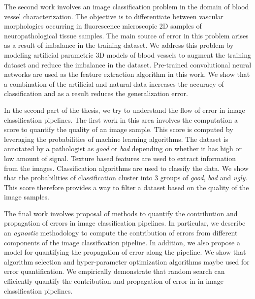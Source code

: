 The second work involves an image classification problem in the domain of blood vessel characterization. The objective is to differentiate between vascular morphologies occurring in fluorescence microscopic 2D samples of neuropathological tissue samples. The main source of error in this problem arises as a result of imbalance in the training dataset. We address this problem by modeling artificial parametric 3D models of blood vessels to augment the training dataset and reduce the imbalance in the dataset. Pre-trained convolutional neural networks are used as the feature extraction algorithm in this work. We show that a combination of the artificial and natural data increases the accuracy of classification and as a result reduces the generalization error.

In the second part of the thesis, we try to understand the flow of error in image classification pipelines. The first work in this area involves the computation a score to quantify the quality of an image sample. This score is computed by leveraging the probabilities of machine learning algorithms. The dataset is annotated by a pathologist as \textit{good} or \textit{bad} depending on whether it has high or low amount of signal. Texture based features are used to extract information from the images. Classification algorithms are used to classify the data. We show that the probabilities of classification cluster into 3 groups of \textit{good}, \textit{bad} and \textit{ugly}. This score therefore provides a way to filter a dataset based on the quality of the image samples.

The final work involves proposal of methods to quantify the contribution and propagation of errors in image classification pipelines. In particular, we describe an \textit{agnostic} methodology to compute the contribution of errors from different components of the image classification pipeline. In addition, we also propose a model for quantifying the propagation of error along the pipeline. We show that algorithm selection and hyper-parameter optimization algorithms maybe used for error quantification. We empirically demonstrate that random search can efficiently quantify the contribution and propagation of error in  in image classification pipelines.


